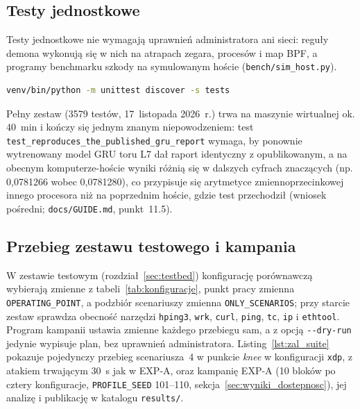 \documentclass[a4paper,12pt]{article}
\begin{document}
\subsection{Testy jednostkowe}\label{sec:zal_testy}
Testy jednostkowe nie wymagają uprawnień administratora ani sieci: reguły demona wykonują się w nich na atrapach zegara, procesów i map BPF, a programy benchmarku szkody na symulowanym hoście (\texttt{bench/\allowbreak sim\_host.py}).

\begin{lstlisting}[language=bash, caption={Testy jednostkowe}, label=lst:zal_testy]
venv/bin/python -m unittest discover -s tests
\end{lstlisting}

Pełny zestaw (3579 testów, 17~listopada 2026~r.) trwa na maszynie wirtualnej ok. 40~min i kończy się jednym znanym niepowodzeniem: test \texttt{test\_\allowbreak reproduces\_\allowbreak the\_\allowbreak published\_\allowbreak gru\_\allowbreak report} wymaga, by ponownie wytrenowany model GRU toru L7 dał raport identyczny z opublikowanym, a na obecnym komputerze-hoście wyniki różnią się w dalszych cyfrach znaczących (np. 0,0781266 wobec 0,0781280), co przypisuje się arytmetyce zmiennoprzecinkowej innego procesora niż na poprzednim hoście, gdzie test przechodził (wniosek pośredni; \texttt{docs/\allowbreak GUIDE.md}, punkt~11.5).

\subsection{Przebieg zestawu testowego i kampania}\label{sec:zal_przebieg}
W zestawie testowym (rozdział~\ref{sec:testbed}) konfigurację porównawczą wybierają zmienne z tabeli~\ref{tab:konfiguracje}, punkt pracy zmienna \texttt{OPERATING\_POINT}, a podzbiór scenariuszy zmienna \texttt{ONLY\_SCENARIOS}; przy starcie zestaw sprawdza obecność narzędzi \texttt{hping3}, \texttt{wrk}, \texttt{curl}, \texttt{ping}, \texttt{tc}, \texttt{ip} i \texttt{ethtool}. Program kampanii ustawia zmienne każdego przebiegu sam, a z opcją \texttt{-{}-dry-run} jedynie wypisuje plan, bez uprawnień administratora. Listing~\ref{lst:zal_suite} pokazuje pojedynczy przebieg scenariusza~4 w punkcie \textit{knee} w konfiguracji \texttt{xdp}, z atakiem trwającym 30~s jak w EXP-A, oraz kampanię EXP-A (10 bloków po cztery konfiguracje, \texttt{PROFILE\_SEED} 101--110, sekcja~\ref{sec:wyniki_dostepnosc}), jej analizę i publikację w katalogu \texttt{results/}.
\end{document}
